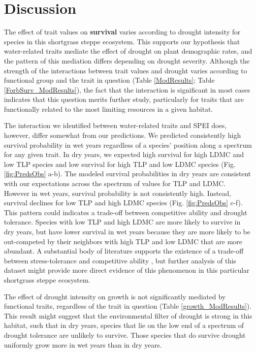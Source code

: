 \documentclass[12pt, letterpaper]{article}
\begin{document}
\section{Discussion}
The effect of trait values on \textbf{survival} varies according to drought intensity for species in this shortgrass steppe ecosystem. This supports our hypothesis that water-related traits mediate the effect of drought on plant demographic rates, and the pattern of this mediation differs depending on drought severity. Although the strength of the interactions between trait values and drought varies according to functional group and the trait in question (Table \ref{ModResults}; Table \ref{ForbSurv_ModResults}), the fact that the interaction is significant in most cases indicates that this question merits further study, particularly for traits that are functionally related to the most limiting resources in a given habitat. 

The interaction we identified between water-related traits and SPEI does, however, differ somewhat from our predictions. We predicted consistently high survival probability in wet years regardless of a species' position along a spectrum for any given trait. In dry years, we expected high survival for high LDMC and low TLP species and low survival for high TLP and low LDMC species (Fig. \ref{fig:PredsObs} a-b). The modeled survival probabilities in dry years are consistent with our expectations across the spectrum of values for TLP and LDMC. However in wet years, survival probability is not consistently high. Instead, survival declines for low TLP and high LDMC species (Fig. \ref{fig:PredsObs} c-f). This pattern could indicates a trade-off between competitive ability and drought tolerance. Species with low TLP and high LDMC are more likely to survive in dry years, but have lower survival in wet years because they are more likely to be out-competed by their neighbors with high TLP and low LDMC that are more abundant. A substantial body of literature supports the existence of a trade-off between stress-tolerance and competitive ability \citep{Grime1979, Grime1997, Craine2007, Volaire2018}, but further analysis of this dataset might provide more direct evidence of this phenomenon in this particular shortgrass steppe ecosystem. 

The effect of drought intensity on growth is not significantly mediated by functional traits, regardless of the trait in question (Table \ref{growth_ModResults}). This result might suggest that the environmental filter \citep{HilleRisLambers2012} of drought is strong in this habitat, such that in dry years, species that lie on the low end of a spectrum of drought tolerance are unlikely to survive. Those species that do survive drought uniformly grow more in wet years than in dry years.   
\end{document}
